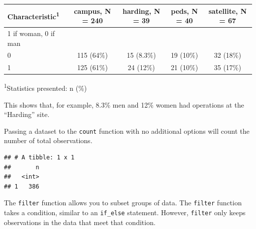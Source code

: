 \documentclass[]{book}
\newenvironment{Shaded}{\begin{snugshade}}{\end{snugshade}}
\newcommand{\CommentTok}[1]{\textcolor[rgb]{0.56,0.35,0.01}{\textit{#1}}}
\newcommand{\DataTypeTok}[1]{\textcolor[rgb]{0.13,0.29,0.53}{#1}}
\newcommand{\KeywordTok}[1]{\textcolor[rgb]{0.13,0.29,0.53}{\textbf{#1}}}
\newcommand{\NormalTok}[1]{#1}
\newcommand{\OperatorTok}[1]{\textcolor[rgb]{0.81,0.36,0.00}{\textbf{#1}}}
\newcommand{\OtherTok}[1]{\textcolor[rgb]{0.56,0.35,0.01}{#1}}
\newcommand{\StringTok}[1]{\textcolor[rgb]{0.31,0.60,0.02}{#1}}
\begin{document}
\begin{Shaded}
\end{Shaded}

\captionsetup[table]{labelformat=empty,skip=1pt}
\begin{longtable}{lcccc}
\toprule
\textbf{Characteristic}\textsuperscript{1} & \textbf{campus}, N = 240 & \textbf{harding}, N = 39 & \textbf{peds}, N = 40 & \textbf{satellite}, N = 67 \\ 
\midrule
1 if woman, 0 if man &  &  &  &  \\ 
0 & 115 (64\%) & 15 (8.3\%) & 19 (10\%) & 32 (18\%) \\ 
1 & 125 (61\%) & 24 (12\%) & 21 (10\%) & 35 (17\%) \\ 
\bottomrule
\end{longtable}
\vspace{-5mm}
\begin{minipage}{\linewidth}
\textsuperscript{1}Statistics presented: n (\%) \\ 
\end{minipage}

This shows that, for example, 8.3\% men and 12\% women had operations at
the ``Harding'' site.

Passing a dataset to the \texttt{count} function with no additional
options will count the number of total observations.

\begin{Shaded}
\end{Shaded}

\begin{verbatim}
## # A tibble: 1 x 1
##       n
##   <int>
## 1   386
\end{verbatim}

The \texttt{filter} function allows you to subset groups of data. The
\texttt{filter} function takes a condition, similar to an
\texttt{if\_else} statement. However, \texttt{filter} only keeps
observations in the data that meet that condition.
\end{document}
